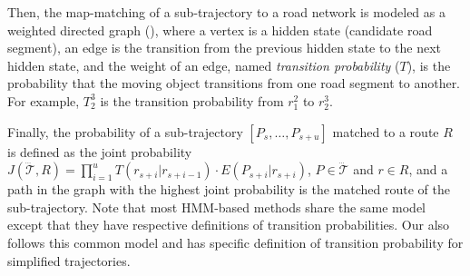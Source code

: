 Then, the map-matching of a sub-trajectory to a road network is
modeled as a weighted directed graph (), where a vertex is a hidden state (candidate road segment), an edge is the transition from the previous hidden state to the next hidden state, and the weight of an edge, named \emph{transition probability} ($T$), is the probability that the moving object transitions from one road segment to another. For example, {$T_{2}^3$} is the transition probability from {$r_1^2$ to $r_2^3$}.

Finally, the probability of a sub-trajectory $[P_s, \ldots, P_{s+u}]$ matched to a route $R$ is defined as the joint probability $J(\dddot{\mathcal{T}}, R) = \prod_{i=1}^u{T(r_{s+i}|r_{s+i-1})\cdot E(P_{s+i}|r_{s+i})}$, $P\in \dddot{\mathcal{T}}$ and $r\in R$, and a path in the graph with the highest joint probability is the matched route of the sub-trajectory.
Note that most HMM-based methods share the same model except that they have respective definitions of transition probabilities.
Our \stmm also follows this common model and has specific definition of
transition probability for simplified {trajectories}.



